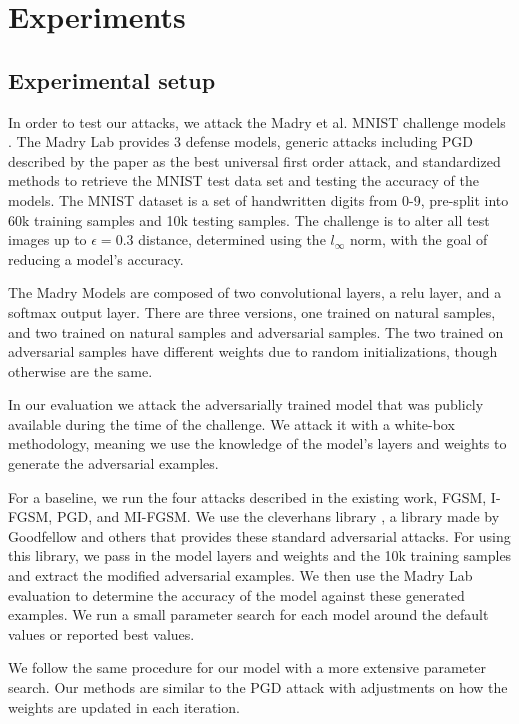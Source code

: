 \section{Experiments}
\subsection{Experimental setup}
In order to test our attacks, we attack the Madry et al. MNIST challenge models \cite{madry2017towards}. The Madry Lab provides 3 defense models, generic attacks including PGD described by the paper as the best universal first order attack, and standardized methods to retrieve the MNIST test data set and testing the accuracy of the models. The MNIST dataset is a set of handwritten digits from 0-9, pre-split into 60k training samples and 10k testing samples. The challenge is to alter all test images up to $\epsilon=0.3$ distance, determined using the $l_\infty$ norm, with the goal of reducing a model's accuracy.

The Madry Models are composed of two convolutional layers, a relu layer, and a softmax output layer. There are three versions, one trained on natural samples, and two trained on natural samples and adversarial samples. The two trained on adversarial samples have different weights due to random initializations, though otherwise are the same. 

In our evaluation we attack the adversarially trained model that was publicly available during the time of the challenge. We attack it with a white-box methodology, meaning we use the knowledge of the model's layers and weights to generate the adversarial examples.

For a baseline, we run the four attacks described in the existing work, FGSM, I-FGSM, PGD, and MI-FGSM. We use the cleverhans library \cite{GoodfellowPM16}, a library made by Goodfellow and others that provides these standard adversarial attacks. For using this library, we pass in the model layers and weights and the 10k training samples and extract the modified adversarial examples. We then use the Madry Lab evaluation to determine the accuracy of the model against these generated examples. We run a small parameter search for each model around the default values or reported best values.

We follow the same procedure for our model with a more extensive parameter search. Our methods are similar to the PGD attack with adjustments on how the weights are updated in each iteration.

